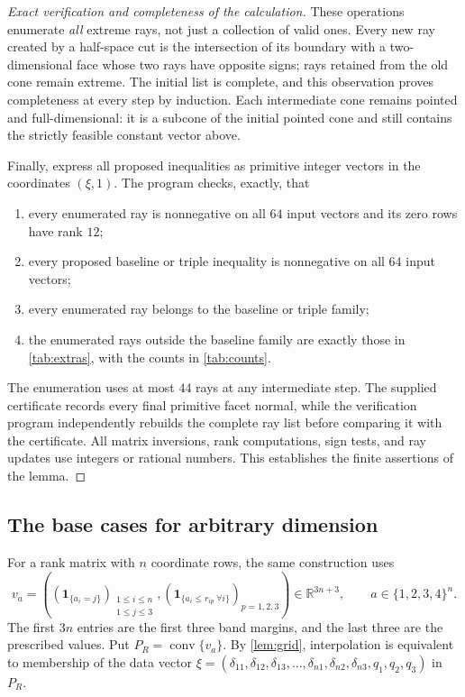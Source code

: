 \documentclass[a4paper,11pt]{amsart}
\numberwithin{equation}{section}
\theoremstyle{definition}
\theoremstyle{remark}
\newcommand{\R}{\mathbb R}
\begin{document}
\begin{proof}[Exact verification and completeness of the calculation]
These operations enumerate \emph{all} extreme rays, not just a collection
of valid ones. Every new ray created by a half-space cut is the
intersection of its boundary with a two-dimensional face whose two rays
have opposite signs; rays retained from the old cone remain extreme.
The initial list is complete, and this observation proves completeness
at every step by induction. Each intermediate cone remains pointed and
full-dimensional: it is a subcone of the initial pointed cone and still
contains the strictly feasible constant vector above.

Finally, express all proposed inequalities as primitive integer vectors
in the coordinates $(\xi,1)$. The program checks, exactly, that
\begin{enumerate}
\item every enumerated ray is nonnegative on all $64$ input vectors and
      its zero rows have rank $12$;
\item every proposed baseline or triple inequality is nonnegative on
      all $64$ input vectors;
\item every enumerated ray belongs to the baseline or triple family;
\item the enumerated rays outside the baseline family are exactly those
      in \cref{tab:extras}, with the counts in \cref{tab:counts}.
\end{enumerate}
The enumeration uses at most $44$ rays at any intermediate step.
The supplied certificate records every final primitive facet normal,
while the verification program independently rebuilds the complete ray
list before comparing it with the certificate. All matrix inversions,
rank computations, sign tests, and ray updates use integers or rational
numbers. This establishes the finite assertions of the lemma.
\end{proof}

\subsection{The base cases for arbitrary dimension}


For a rank matrix with $n$ coordinate rows, the same construction uses
\begin{equation}
 v_a=\left((\boldsymbol{1}_{\{a_i=j\}})_{\substack{1\leq i\leq n\\1\leq j\leq3}},
       (\boldsymbol{1}_{\{a_i\leq r_{ip}\ \forall i\}})_{p=1,2,3}\right)
       \in\R^{3n+3},\qquad a\in\{1,2,3,4\}^n.
 \label{eq:general-vertices}
\end{equation}
The first $3n$ entries are the first three band margins, and the last
three are the prescribed values. Put $P_R=\operatorname{conv}\{v_a\}$.
By \cref{lem:grid}, interpolation is equivalent to membership of the data
vector $\xi=(\delta_{11},\delta_{12},\delta_{13},\ldots,
\delta_{n1},\delta_{n2},\delta_{n3},q_1,q_2,q_3)$ in $P_R$.
\end{document}

